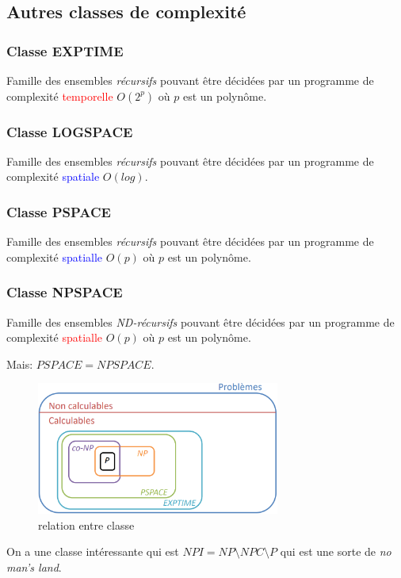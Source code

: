 \documentclass{report}
\begin{document}
\subsection{Autres classes de complexité}

\subsubsection{Classe EXPTIME}
Famille des ensembles \textit{récursifs} pouvant être décidées par un programme de complexité \textcolor{red}{temporelle} $O(2^p)$ où $p$ est un polynôme.

\subsubsection{Classe LOGSPACE}
Famille des ensembles \textit{récursifs} pouvant être décidées par un programme de complexité \textcolor{blue}{spatiale} $O(log)$.

\subsubsection{Classe PSPACE}
Famille des ensembles \textit{récursifs} pouvant être décidées par un programme de complexité \textcolor{blue}{spatialle} $O(p)$ où $p$ est un polynôme.

\subsubsection{Classe NPSPACE}
Famille des ensembles \textit{ND-récursifs} pouvant être décidées par un programme de complexité \textcolor{red}{spatialle} $O(p)$ où $p$ est un polynôme.\par 
Mais: $PSPACE = NPSPACE$.
\begin{figure}[H]
\centering
\includegraphics[width=8cm]{img/classe.png}
\caption{relation entre classe}
\end{figure}

On a une classe intéressante qui est $NPI = NP \setminus NPC \setminus P$ qui est une sorte de \textit{no man's land}.
\end{document}
